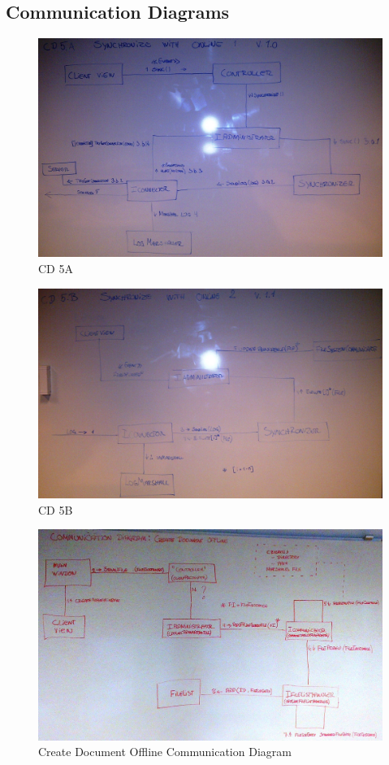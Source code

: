 \subsection{Communication Diagrams}
\begin{figure}[H]
  \includegraphics[width=\textwidth]{illustrations/CD5A.jpg}
  \caption{CD 5A}
  \label{CD5A}
\end{figure}
\begin{figure}[H]
  \includegraphics[width=\textwidth]{illustrations/CD5B.jpg}
  \caption{CD 5B}
  \label{CD5B}
\end{figure}
\begin{figure}[H]
  \includegraphics[width=\textwidth]{illustrations/CreateDocDiagram.jpg}
  \caption{Create Document Offline Communication Diagram}
\end{figure}
